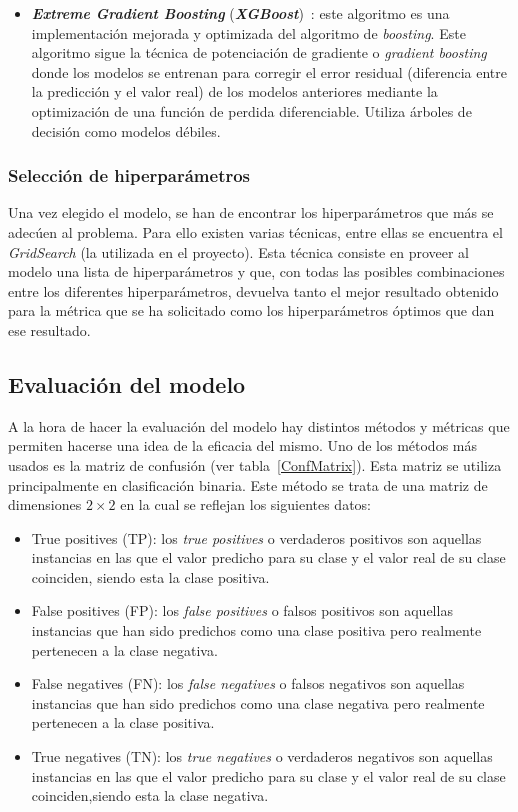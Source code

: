 \begin{itemize}
\item \textbf{\textit{Extreme Gradient Boosting}} (\textbf{\textit{XGBoost}})~\cite{XGBOOST}: este algoritmo es una implementación mejorada y optimizada del algoritmo de \textit{boosting}. Este algoritmo sigue la técnica de potenciación de gradiente o \textit{gradient boosting} donde los modelos se entrenan para corregir el error residual (diferencia entre la predicción y el valor real) de los modelos anteriores mediante la optimización de una función de perdida diferenciable. Utiliza árboles de decisión como modelos débiles.
\end{itemize}
\subsubsection{Selección de hiperparámetros}

Una vez elegido el modelo, se han de encontrar los hiperparámetros que más se adecúen al problema. Para ello existen varias técnicas, entre ellas se encuentra el \textit{GridSearch} (la utilizada en el proyecto). Esta técnica consiste en proveer al modelo una lista de hiperparámetros y que, con todas las posibles combinaciones entre los diferentes hiperparámetros, devuelva tanto el mejor resultado obtenido para la métrica que se ha solicitado como los hiperparámetros óptimos que dan ese resultado.




\subsection{Evaluación del modelo}


A la hora de hacer la evaluación del modelo hay distintos métodos y métricas que permiten hacerse una idea de la eficacia del mismo. Uno de los métodos más usados es la matriz de confusión (ver tabla~\ref{ConfMatrix}). Esta matriz se utiliza principalmente en clasificación binaria. Este método se trata de una matriz de dimensiones $2\times2$ en la cual se reflejan los siguientes datos:
\begin{itemize}
\item True positives (TP): los \textit{true positives} o verdaderos positivos son aquellas instancias en las que el valor predicho para su clase y el valor real de su clase coinciden, siendo esta la clase positiva. 
\item False positives (FP): los \textit{false positives} o falsos positivos son aquellas instancias que han sido predichos como una clase positiva pero realmente pertenecen a la clase negativa.
\item False negatives (FN): los \textit{false negatives} o falsos negativos son aquellas instancias que han sido predichos como una clase negativa pero realmente pertenecen a la clase positiva.
\item True negatives (TN): los \textit{true negatives} o verdaderos negativos son aquellas instancias en las que el valor predicho para su clase y el valor real de su clase coinciden,siendo esta la clase negativa. 
\end{itemize} 



